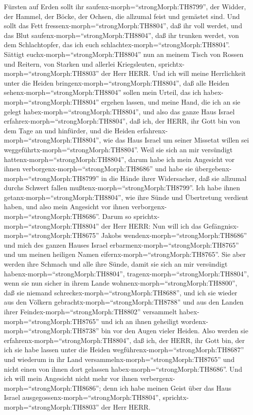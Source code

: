 Fürsten auf Erden sollt ihr saufenx-morph=``strongMorph:TH8799'', der
Widder, der Hammel, der Böcke, der Ochsen, die allzumal feist und
gemästet sind.  Und sollt das Fett
fressenx-morph=``strongMorph:TH8804'', daß ihr voll werdet, und das Blut
saufenx-morph=``strongMorph:TH8804'', daß ihr trunken werdet, von dem
Schlachtopfer, das ich euch schlachtex-morph=``strongMorph:TH8804''.
 Sättigt euchx-morph=``strongMorph:TH8804'' nun an meinem
Tisch von Rossen und Reitern, von Starken und allerlei Kriegsleuten,
sprichtx-morph=``strongMorph:TH8803'' der Herr HERR.  Und
ich will meine Herrlichkeit unter die Heiden
bringenx-morph=``strongMorph:TH8804'', daß alle Heiden
sehenx-morph=``strongMorph:TH8804'' sollen mein Urteil, das ich
habex-morph=``strongMorph:TH8804'' ergehen lassen, und meine Hand, die
ich an sie gelegt habex-morph=``strongMorph:TH8804'',  und
also das ganze Haus Israel erfahrex-morph=``strongMorph:TH8804'', daß
ich, der HERR, ihr Gott bin von dem Tage an und hinfürder, 
und die Heiden erfahrenx-morph=``strongMorph:TH8804'', wie das Haus
Israel um seiner Missetat willen sei
weggeführtx-morph=``strongMorph:TH8804''. Weil sie sich an mir
versündigt hattenx-morph=``strongMorph:TH8804'', darum habe ich mein
Angesicht vor ihnen verborgenx-morph=``strongMorph:TH8686'' und habe sie
übergebenx-morph=``strongMorph:TH8799'' in die Hände ihrer Widersacher,
daß sie allzumal durchs Schwert fallen
mußtenx-morph=``strongMorph:TH8799''.  Ich habe ihnen
getanx-morph=``strongMorph:TH8804'', wie ihre Sünde und Übertretung
verdient haben, und also mein Angesicht vor ihnen
verborgenx-morph=``strongMorph:TH8686''.  Darum so
sprichtx-morph=``strongMorph:TH8804'' der Herr HERR: Nun will ich das
Gefängnisx-morph=``strongMorph:TH8675'' Jakobs
wendenx-morph=``strongMorph:TH8686'' und mich des ganzen Hauses Israel
erbarmenx-morph=``strongMorph:TH8765'' und um meinen heiligen Namen
eifernx-morph=``strongMorph:TH8765''.  Sie aber werden ihre
Schmach und alle ihre Sünde, damit sie sich an mir versündigt
habenx-morph=``strongMorph:TH8804'',
tragenx-morph=``strongMorph:TH8804'', wenn sie nun sicher in ihrem Lande
wohnenx-morph=``strongMorph:TH8800'', daß sie niemand
schreckex-morph=``strongMorph:TH8688'',  und ich sie wieder
aus den Völkern gebrachtx-morph=``strongMorph:TH8788'' und aus den
Landen ihrer Feindex-morph=``strongMorph:TH8802'' versammelt
habex-morph=``strongMorph:TH8765'' und ich an ihnen geheiligt
wordenx-morph=``strongMorph:TH8738'' bin vor den Augen vieler Heiden.
 Also werden sie erfahrenx-morph=``strongMorph:TH8804'',
daß ich, der HERR, ihr Gott bin, der ich sie habe lassen unter die
Heiden wegführenx-morph=``strongMorph:TH8687'' und wiederum in ihr Land
versammelnx-morph=``strongMorph:TH8765'' und nicht einen von ihnen dort
gelassen habex-morph=``strongMorph:TH8686''.  Und ich will
mein Angesicht nicht mehr vor ihnen
verbergenx-morph=``strongMorph:TH8686''; denn ich habe meinen Geist über
das Haus Israel ausgegossenx-morph=``strongMorph:TH8804'',
sprichtx-morph=``strongMorph:TH8803'' der Herr HERR.

